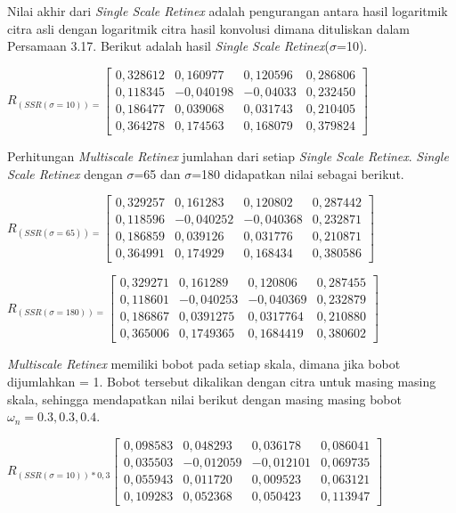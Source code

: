 \noindent Nilai akhir dari \emph{Single Scale Retinex} adalah pengurangan antara hasil logaritmik citra asli dengan logaritmik citra hasil konvolusi dimana dituliskan dalam Persamaan 3.17. Berikut adalah hasil \emph{Single Scale Retinex}($\sigma$=10).

\noindent
$R_{(SSR(\sigma=10))=}\left[
\begin{matrix}
0,328612&	0,160977&	0,120596&	0,286806\\
0,118345&	-0,040198&	-0,04033&	0,232450\\
0,186477&	0,039068&	0,031743&	0,210405\\
0,364278&	0,174563&	0,168079&	0,379824
\end{matrix}
\right]$

\noindent Perhitungan \emph{Multiscale Retinex} jumlahan dari setiap \emph{Single Scale Retinex}. \emph{Single Scale Retinex} dengan $\sigma$=65 dan $\sigma$=180 didapatkan nilai sebagai berikut.

\noindent
$R_{(SSR(\sigma=65))=}\left[
\begin{matrix}
0,329257&	0,161283&	0,120802&	0,287442\\
0,118596&	-0,040252&	-0,040368&	0,232871\\
0,186859&	0,039126&	0,031776&	0,210871\\
0,364991&	0,174929&	0,168434&	0,380586
\end{matrix}
\right]$

\noindent
$R_{(SSR(\sigma=180))=}\left[
\begin{matrix}
0,329271&	0,161289&	0,120806&	0,287455\\
0,118601&	-0,040253&	-0,040369&	0,232879\\
0,186867&	0,0391275&	0,0317764&	0,210880\\
0,365006&	0,1749365&	0,1684419&	0,380602
\end{matrix}
\right]$

\noindent \emph{Multiscale Retinex} memiliki bobot pada setiap skala, dimana jika bobot dijumlahkan = 1. Bobot tersebut dikalikan dengan citra untuk masing masing skala, sehingga mendapatkan nilai berikut dengan masing masing bobot$\omega_n=0.3, 0.3, 0.4$.

\noindent
$R_{(SSR(\sigma=10))*0,3}\left[
\begin{matrix}
0,098583&	0,048293&	0,036178&	0,086041\\
0,035503&	-0,012059&	-0,012101&	0,069735\\
0,055943&	0,011720&	0,009523&	0,063121\\
0,109283&	0,052368&	0,050423&	0,113947
\end{matrix}
\right]$

